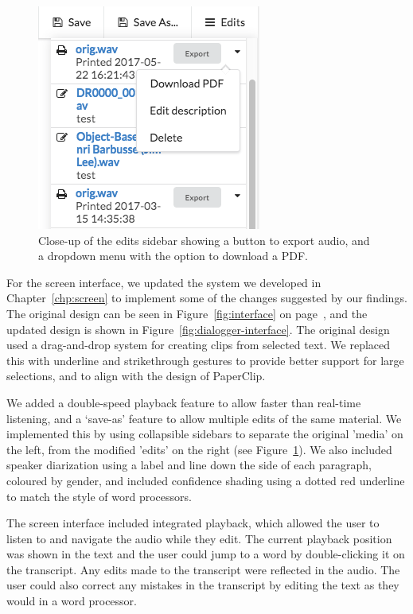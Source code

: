\begin{figure}[p]
  \centering
  \includegraphics[width=0.4\columnwidth]{figs/discourse-download-pdf.png}
  \caption{Close-up of the edits sidebar showing a button to export audio, and a dropdown menu with the option to
  download a PDF.}
  \label{fig:download-pdf}
\end{figure}

For the screen interface, we updated the system we developed in Chapter~\ref{chp:screen} to implement some of the
changes suggested by our findings.  The original design can be seen in Figure~\ref{fig:interface} on
page~\pageref{fig:interface}, and the updated design is shown in Figure~\ref{fig:dialogger-interface}.  The original
design used a drag-and-drop system for creating clips from selected text. We replaced this with underline and
strikethrough gestures to provide better support for large selections, and to align with the design of PaperClip.

We added a double-speed playback feature to allow faster than real-time listening, and a `save-as' feature to allow
multiple edits of the same material.  We implemented this by using collapsible sidebars to separate the original
'media' on the left, from the modified 'edits' on the right (see Figure~\ref{fig:download-pdf}).  We also included
speaker diarization using a label and line down the side of each paragraph, coloured by gender, and included confidence
shading using a dotted red underline to match the style of word processors.

The screen interface included integrated playback, which allowed the user to listen to and navigate the audio while
they edit. The current playback position was shown in the text and the user could jump to a word by double-clicking it
on the transcript. Any edits made to the transcript were reflected in the audio.  The user could also correct any
mistakes in the transcript by editing the text as they would in a word processor.


